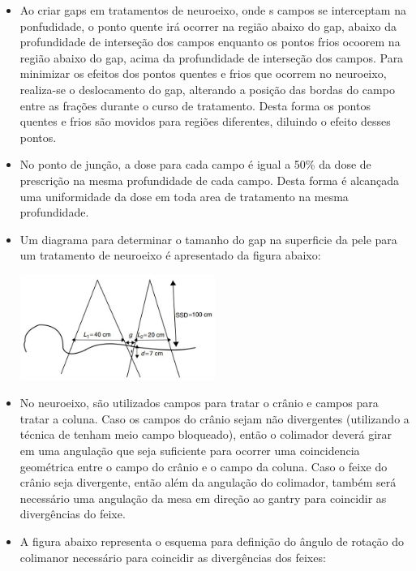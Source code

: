 \documentclass[11pt,a4paper]{article}
\newcounter{exemplo}
\begin{document}
\begin{exemplo}
\begin{itemize}
        \item Ao criar gaps em tratamentos de neuroeixo, onde s campos se interceptam na ponfudidade, o ponto quente irá ocorrer na região abaixo do gap, abaixo da profundidade de interseção dos campos enquanto os pontos frios ocoorem na região abaixo do gap, acima da profundidade de interseção dos campos. Para minimizar os efeitos dos pontos quentes e frios que ocorrem no neuroeixo, realiza-se o deslocamento do gap, alterando a posição das bordas do campo entre as frações durante o curso de tratamento. Desta forma os pontos quentes e frios são movidos para regiões diferentes, diluindo o efeito desses pontos. 

        \item No ponto de junção, a dose para cada campo é igual a 50\% da dose de prescrição na mesma profundidade de cada campo. Desta forma é alcançada uma uniformidade da dose em toda area de tratamento na mesma profundidade. 
        
        \item Um diagrama para determinar o tamanho do gap na superficie da pele para um tratamento de neuroeixo é apresentado da figura abaixo:
            \begin{center}
                \includegraphics[width=0.5\textwidth]{Imagens/gapNeuroEixo.JPG}
            \end{center}
        
        \item No neuroeixo, são utilizados campos para tratar o crânio e campos para tratar a coluna. Caso os campos do crânio sejam não divergentes (utilizando a técnica de tenham meio campo bloqueado), então o colimador deverá girar em uma angulação que seja suficiente para ocorrer uma coincidencia geométrica entre o campo do crânio e o campo da coluna. Caso o feixe do crânio seja divergente, então além da angulação do colimador, também será necessário uma angulação da mesa em direção ao gantry para coincidir as divergências do feixe. 
        
        \item A figura abaixo representa o esquema para definição do ângulo de rotação do colimanor necessário para coincidir as divergências dos feixes:
        

\end{itemize}
\end{exemplo}
\end{document}

